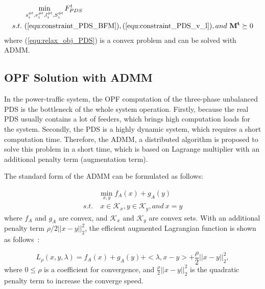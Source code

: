 \documentclass[final]{IEEEtran}
\begin{document}
\begin{subequations}\label{equ:relax_obj_PDS}
	\begin{align} 
	&\min_{s^{\phi t}_{i}, v^{\phi t}_{i}, l^{\phi t}_{i}, S^{\phi t}_{i}} F^t_{PDS} \\
	s.t.\  &(\ref{equ:constraint_PDS_BFM}), (\ref{equ:constraint_PDS_v_l}), and\  \mathbf{M^t}\succeq0
	\end{align}
\end{subequations}
where (\ref{equ:relax_obj_PDS}) is a convex problem and can be solved with ADMM.

\subsection{OPF Solution with ADMM}
In the power-traffic system, the OPF computation of the three-phase unbalanced PDS is the bottleneck of the whole system operation. Firstly, because the real PDS usually contains a lot of feeders, which brings high computation loads for the system. Secondly, the PDS is a highly dynamic system, which requires a short computation time. Therefore, the ADMM, a distributed algorithm is proposed to solve this problem in a short time, which is based on Lagrange multiplier with an additional penalty term (augmentation term). 

The standard form of the ADMM can be formulated as follows:

\begin{subequations}\label{equ:relax_org_ADMM}
	\begin{align} 
	&\min_{x,y} f_{A}(x) + g_{A}(y) \\
	s.t. &\  x \in \mathcal{K}_x, y \in \mathcal{K}_y, and \ x = y
	\end{align}
\end{subequations}
where $f_{A}$ and $ g_{A}$ are convex, and $\mathcal{K}_x$ and $\mathcal{K}_y$ are convex sets. With an additional penalty term $\rho/2 ||x-y||^2_2$, the efficient augmented Lagrangian function is shown as follows~\cite{boyd2011d45istributed}:

\begin{equation}\label{equ:relax_aug_ADMM}
L_{\rho}(x,y,\lambda) = f_{A}(x) + g_{A}(y) + <\lambda,x-y> + \frac{\rho}{2} ||x-y||^2_2,
\end{equation} 
where $0\leq \rho$ is a coefficient for convergence, and $\frac{\rho}{2} ||x-y||^2_2$ is the quadratic penalty term to increase the converge speed.
\end{document}
